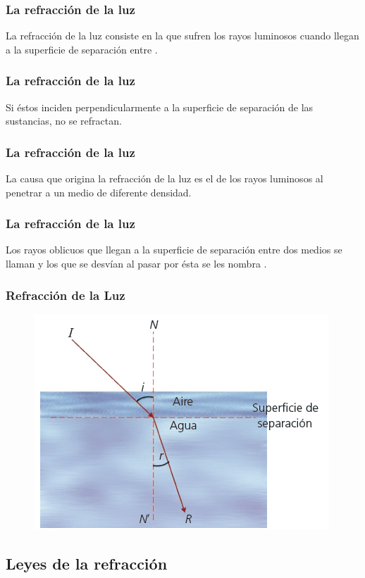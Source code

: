 \documentclass[14pt]{beamer}
\begin{document}
\begin{frame}
\frametitle{La refracción de la luz}
La refracción de la luz consiste en la  que sufren los rayos luminosos cuando llegan a la superficie de separación entre .
\end{frame}
\begin{frame}
\frametitle{La refracción de la luz}
Si éstos inciden perpendicularmente a la superficie de separación de las sustancias, no se refractan.
\end{frame}
\begin{frame}
\frametitle{La refracción de la luz}
La causa que origina la refracción de la luz es el  de los rayos luminosos al penetrar a un medio de diferente densidad.
\end{frame}
\begin{frame}
\frametitle{La refracción de la luz}
Los rayos oblicuos que llegan a la superficie de separación entre dos medios se llaman  y los que se desvían al pasar por ésta se les nombra .
\end{frame}
\begin{frame}
\frametitle{Refracción de la Luz}
\vspace*{-1cm}
\begin{figure}
    \centering
    \includegraphics[scale=0.75]{Imagenes/Optica_Refraccion_01.png}
\end{figure}
\end{frame}

\subsection{Leyes de la refracción}
\end{document}
